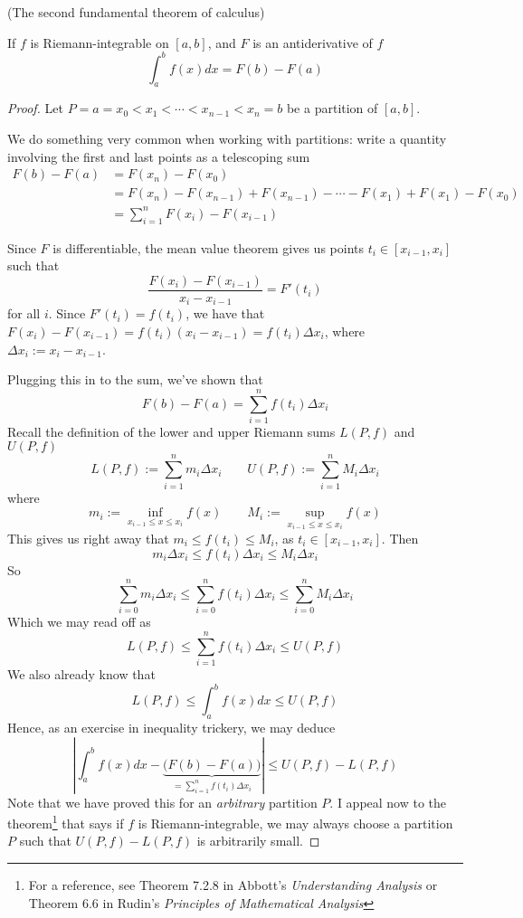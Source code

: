 \documentclass{article}
\begin{document}
\begin{theorem} (The second fundamental theorem of calculus)

    If $f$ is Riemann-integrable on $[a, b]$, and $F$ is an antiderivative of $f$
    \[
        \int_a^b f(x)dx = F(b)-F(a)
    \]
\end{theorem}
\begin{proof}
    Let $P = {a=x_0 < x_1 < \cdots < x_{n-1} < x_n = b}$ be a partition of $[a,b]$.

    We do something very common when working with partitions: write a quantity involving the first and last points as a telescoping sum
    \begin{align*}
        F(b)-F(a) &= F(x_n) - F(x_0) \\
                  &= F(x_n)-F(x_{n-1})+F(x_{n-1}) - \cdots - F(x_1) + F(x_1) - F(x_0) \\
                  &= \sum_{i=1}^n F(x_i) - F(x_{i-1})
    \end{align*}

    Since $F$ is differentiable, the mean value theorem gives us points $t_i \in [x_{i-1},x_i]$ such that 
    \[
        \frac{F(x_i)-F(x_{i-1})}{x_i-x_{i-1}} = F'(t_i)
    \]
    for all $i$. Since $F'(t_i) = f(t_i)$, we have that $F(x_i) - F(x_{i-1}) = f(t_i)(x_i-x_{i-1}) = f(t_i)\Delta x_i$, where $\Delta x_i := x_i - x_{i-1}$.

    Plugging this in to the sum, we've shown that
    \[
        F(b)-F(a) = \sum_{i=1}^n f(t_i) \Delta x_i
    \]
    Recall the definition of the lower and upper Riemann sums $L(P, f)$ and $U(P, f)$
    \[
        L(P, f) := \sum_{i=1}^n m_i\Delta x_i \qquad U(P, f) := \sum_{i=1}^n M_i\Delta x_i 
    \]
    where 
    \[
        m_i := \inf_{x_{i-1} \leq x \leq x_i} f(x) \qquad M_i := \sup_{x_{i-1} \leq x \leq x_i} f(x) 
    \]
    This gives us right away that $m_i \leq f(t_i) \leq M_i$, as $t_i \in [x_{i-1}, x_i]$. Then 
    \[
        m_i\Delta x_i \leq f(t_i)\Delta x_i \leq M_i \Delta x_i
    \]
    So
    \[
        \sum_{i=0}^n m_i\Delta x_i \leq \sum_{i=0}^n f(t_i)\Delta x_i \leq \sum_{i=0}^n M_i \Delta x_i
    \]
    Which we may read off as
    \[
        L(P, f) \leq \sum_{i=1}^n f(t_i) \Delta x_i \leq U(P, f) 
    \]
    We also already know that
    \[
        L(P, f) \leq \int_a^b f(x)dx \leq U(P, f) 
    \]
    Hence, as an exercise in inequality trickery, we may deduce
    \[
    \left|\int_a^b f(x)dx - \underbrace{\big(F(b)-F(a)\big)}_{=\sum_{i=1}^n f(t_i)\Delta x_i}\right| \leq U(P,f) - L(P, f)
    \]
    Note that we have proved this for an \emph{arbitrary} partition $P$. I appeal now to the theorem\footnote{For a reference, see Theorem 7.2.8 in Abbott's \textit{Understanding Analysis} or Theorem 6.6 in Rudin's \textit{Principles of Mathematical Analysis}} that says if $f$ is Riemann-integrable, we may always choose a partition $P$ such that $U(P, f) - L(P, f)$ is arbitrarily small.


\end{proof}
\end{document}
